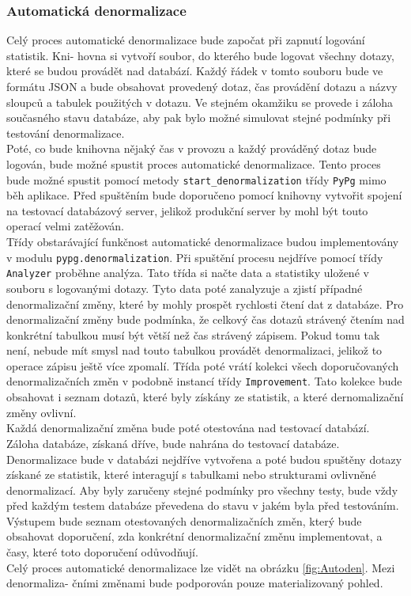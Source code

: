 \documentclass[ing,male,java,dept456]{diploma}						%
\begin{document}

\subsubsection{Automatická denormalizace}

Celý proces automatické denormalizace bude započat při zapnutí logování statistik. Kni- hovna si vytvoří soubor, do kterého bude logovat všechny dotazy, které se budou provádět nad databází. Každý řádek v tomto souboru bude ve formátu JSON a bude obsahovat provedený dotaz, čas provádění dotazu a názvy sloupců a tabulek použitých v dotazu. Ve stejném okamžiku se provede i záloha současného stavu databáze, aby pak bylo možné simulovat stejné podmínky při testování denormalizace. \\
Poté, co bude knihovna nějaký čas v provozu a každý prováděný dotaz bude logován, bude možné spustit proces automatické denormalizace. Tento proces bude možné spustit pomocí metody \lstinline[style=inlinepython]|start_denormalization| třídy \lstinline[style=inlinepython]|PyPg| mimo běh aplikace. Před spuštěním bude doporučeno pomocí knihovny vytvořit spojení na testovací databázový server, jelikož produkční server by mohl být touto operací velmi zatěžován. \\
Třídy obstarávající funkčnost automatické denormalizace budou implementovány v modulu \lstinline[style=inlinepython]|pypg.denormalization|. Při spuštění procesu nejdříve pomocí třídy \lstinline[style=inlinepython]|Analyzer| proběhne analýza. Tato třída si načte data a statistiky uložené v souboru s logovanými dotazy. Tyto data poté zanalyzuje a zjistí případné denormalizační změny, které by mohly prospět rychlosti čtení dat z databáze. Pro denormalizační změny bude podmínka, že celkový čas dotazů strávený čtením nad konkrétní tabulkou musí být větší než čas strávený zápisem. Pokud tomu tak není, nebude mít smysl nad touto tabulkou provádět denormalizaci, jelikož to operace zápisu ještě více zpomalí. Třída poté vrátí kolekci všech doporučovaných denormalizačních změn v podobně instancí třídy \lstinline[style=inlinepython]|Improvement|. Tato kolekce bude obsahovat i seznam dotazů, které byly získány ze statistik, a které dernomalizační změny ovlivní. \\
Každá denormalizační změna bude poté otestována nad testovací databází. Záloha databáze, získaná dříve, bude nahrána do testovací databáze. Denormalizace bude v databázi nejdříve vytvořena a poté budou spuštěny dotazy získané ze statistik, které interagují s tabulkami nebo strukturami ovlivněné denormalizací. Aby byly zaručeny stejné podmínky pro všechny testy, bude vždy před každým testem databáze převedena do stavu v jakém byla před testováním. \\
Výstupem bude seznam otestovaných denormalizačních změn, který bude obsahovat doporučení, zda konkrétní denormalizační změnu implementovat, a časy, které toto doporučení odůvodňují. \\
Celý proces automatické denormalizace lze vidět na obrázku \ref{fig:Autoden}. Mezi denormaliza- čními změnami bude podporován pouze materializovaný pohled.
\end{document}
